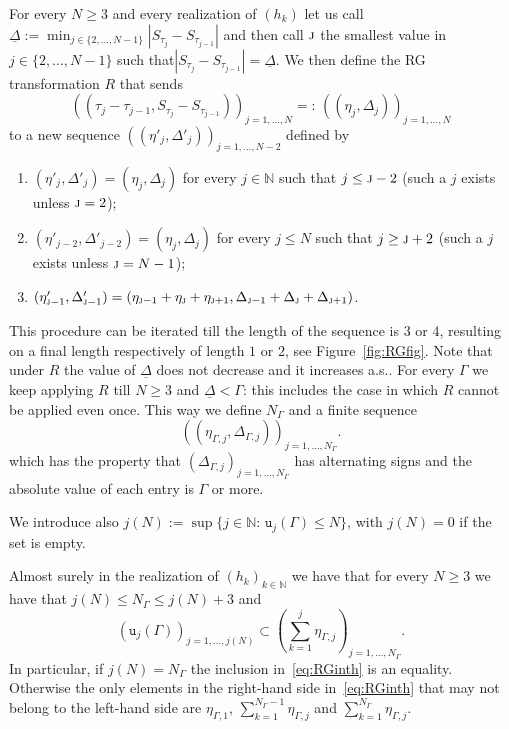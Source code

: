 \documentclass[AHL,Unicode,longabstracts,published]{cedram}
\newcommand{\bbN}{\mathbb{N}}
\newcommand{\gG}{\Gamma}
\newcommand{\gD}{\Delta}
\renewcommand*\ss{\mathtt{u}}
\newcommand{\tu}{\ss}
\begin{document}
For every $N\ge 3$ and every realization of $(h_k)$ let us call $\underline{\gD}:= \min_{j\in\{2, \dots, N-1\}}| S_{\tau_{j}}-S_{\tau_{j-1}}|$ and then call $\textsc{j}$ the smallest value in $j\in \{2, \dots, N-1\}$ such that\linebreak ${| S_{\tau_{j}}-S_{\tau_{j-1}}|=\underline{\gD}}$. We then define the RG transformation $R$ that sends
\begin{equation}
\left(\left(\tau_{j}-\tau_{j-1}, S_{\tau_{j}}-S_{\tau_{j-1}}\right)\right)_{j=1, \dots, N}=: \,
\left(\left(\eta_j, \gD_j \right)\right)_{j=1, \dots, N}
\end{equation}
to a new sequence $((\eta'_j, \gD'_j))_{j=1, \dots, N-2}$ defined by
\begin{enumerate}
\item $ (\eta'_j, \gD'_j)= (\eta_j, \gD_j)$ for every $j\in \bbN$ such that $ j \le \textsc{j}-2$ (such a $j$ exists unless $\textsc{j}=2$);
\item $ (\eta'_{j-2}, \gD'_{j-2})= (\eta_j, \gD_j)$ for every $j\le N$ such that $ j \ge \textsc{j}+2$ (such a $j$ exists unless $\textsc{j}=N-1$);
\item $ (\eta'_{\textsc{j}-1}, \gD'_{\textsc{j}-1})= (\eta_{\textsc{j}-1}+ \eta_{\textsc{j}}+ \eta_{\textsc{j}+1}, \gD_{\textsc{j}-1}+ \gD_{\textsc{j}}+ \gD_{\textsc{j}+1})$.
\end{enumerate}

This procedure can be iterated till the length of the sequence is $3$ or $4$, resulting on a final length respectively of length $1$ or $2$, see Figure~\ref{fig:RGfig}. Note that under $R$ the value of $\underline{\gD}$ does not decrease and it increases a.s.. For every $\gG$ we keep applying $R$ till $N\ge 3$ and $\underline{\gD}< \gG$: this includes the case in which $R$ cannot be applied even once. This way we define $N_\gG$ and a finite sequence
\begin{equation}\label{eq:alt-signs-Gamma}
\left(\left(\eta_{\gG,j}, \gD_{\gG,j}\right)\right)_{j=1, \dots,N_\gG }.
\end{equation}
which has the property that $\left(\gD_{\gG,j}\right)_{j=1, \dots,N_\gG }$ has alternating signs and the absolute value of each entry is $\gG$ or more.

We introduce also $j(N):= \sup\{j\in \bbN: \, \tu_j(\gG) \le N\}$, with $j(N)=0$ if the set is empty.


\begin{prop}\label{th:RG}
Almost surely in the realization of $(h_k)_{k\in \bbN}$ we have that for every $N\ge 3$ we have that $j(N) \le N_\gG \le j(N)+3$ and
\begin{equation}\label{eq:RGinth}
\left(\tu_j(\gG)\right)_{j=1, \dots,j(N)} \subset \left(\sum_{k=1}^j \eta_{\gG,j} \right)_{j=1,\dots, N_\gG}.
\end{equation}
In particular, if $j(N)=N_\gG$ the inclusion in~\eqref{eq:RGinth} is an equality. Otherwise the only elements in the right-hand side in~\eqref{eq:RGinth} that may not belong to the left-hand side are $ \eta_{\gG,1}$, $\sum_{k=1}^{N_\gG-1} \eta_{\gG,j}$ and $\sum_{k=1}^{N_\gG} \eta_{\gG,j}$.
\end{prop}
\end{document}
